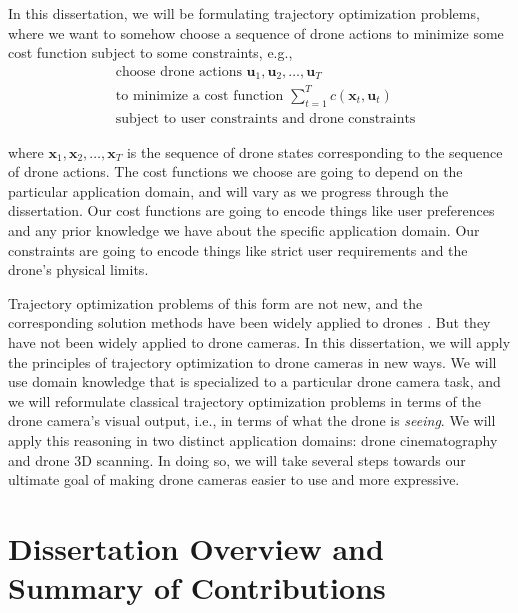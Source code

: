 \noindent In this dissertation, we will be formulating trajectory optimization problems, where we want to somehow choose a sequence of drone actions to minimize some cost function subject to some constraints, e.g.,
~
\begin{equation*}
\begin{aligned}
& \text{choose drone actions } \mathbf{u}_1, \mathbf{u}_2, \ldots, \mathbf{u}_T\\
& \text{to minimize a cost function } \sum_{t=1}^T c( \mathbf{x}_t, \mathbf{u}_t)\\
& \text{subject to user constraints and drone constraints}
\end{aligned}
\end{equation*}

\noindent where $\mathbf{x}_1, \mathbf{x}_2, \ldots, \mathbf{x}_T$ is the sequence of drone states corresponding to the sequence of drone actions.
The cost functions we choose are going to depend on the particular application domain, and will vary as we progress through the dissertation.
Our cost functions are going to encode things like user preferences and any prior knowledge we have about the specific application domain.
Our constraints are going to encode things like strict user requirements and the drone's physical limits.

Trajectory optimization problems of this form are not new, and the corresponding solution methods have been widely applied to drones \cite{kumar:2012}.
But they have not been widely applied to drone cameras.
In this dissertation, we will apply the principles of trajectory optimization to drone cameras in new ways.
We will use domain knowledge that is specialized to a particular drone camera task, and we will reformulate classical trajectory optimization problems in terms of the drone camera's visual output, i.e., in terms of what the drone is \emph{seeing}.
We will apply this reasoning in two distinct application domains: drone cinematography and drone 3D scanning.
In doing so, we will take several steps towards our ultimate goal of making drone cameras easier to use and more expressive.

\section{Dissertation Overview and Summary of Contributions}

